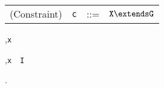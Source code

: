 \begin{figure*}
\begin{minipage}{\textwidth}
\centering
\begin{tabular}{r@{\quad}rcl}
  (Constraint) & {\tt c} &{::=}& $\tt X\extends G$ \\
\end{tabular}
\end{minipage}%

\begin{minipage}{.4\textwidth}
\quad{}
	{}

	{\Gamma\vdash\false}
\end{minipage}%
\begin{minipage}{.6\textwidth}
\quad{}
	{\Gamma,{\tt x}}

	{\Gamma,{\tt x}~\has~{\tt I}}
\end{minipage}%
\caption{.}
\label{fig:FXGB}
\end{figure*}

